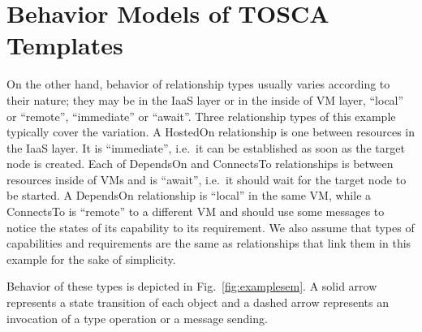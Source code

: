 \documentclass[12pt]{report}
\begin{document}
\section{Behavior Models of TOSCA Templates}
\label{sec:TOSCAbehavior}
On the other hand, behavior of relationship types usually varies
according to their nature; they may be in the IaaS layer or in the
inside of VM layer, ``local'' or ``remote'', ``immediate'' or
``await''. Three relationship types of this example typically cover
the variation. A HostedOn relationship is one between resources in the
IaaS layer.  It is ``immediate'', i.e.\ it can be established as soon
as the target node is created.  Each of DependsOn and ConnectsTo
relationships is between resources inside of VMs and is ``await'',
i.e.\ it should wait for the target node to be started. A DependsOn
relationship is ``local'' in the same VM, while a ConnectsTo is
``remote'' to a different VM and should use some messages to notice
the states of its capability to its requirement.  We also assume that
types of capabilities and requirements are the same as relationships
that link them in this example for the sake of simplicity.

Behavior of these types is depicted in Fig.~\ref{fig:examplesem}.  A
solid arrow represents a state transition of each object and a dashed
arrow represents an invocation of a type operation or a message
sending.
\end{document}
